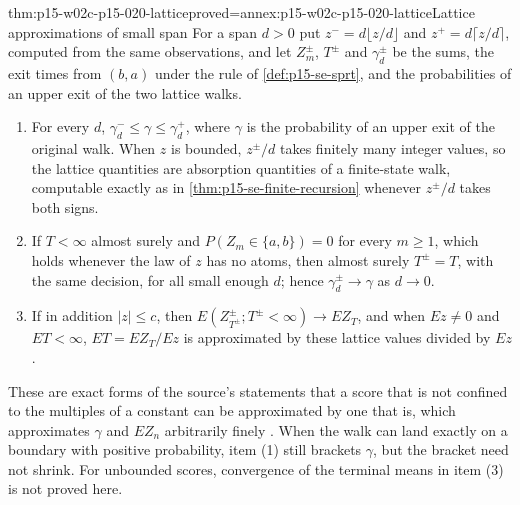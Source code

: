\begin{hbtheorem}{thm:p15-w02c-p15-020-lattice}{proved=annex:p15-w02c-p15-020-lattice}{Lattice approximations of small span}
For a span \(d>0\) put \(z^-=d\lfloor z/d\rfloor\) and
\(z^+=d\lceil z/d\rceil\), computed from the same observations, and let
\(Z_m^\pm\), \(T^\pm\) and \(\gamma^\pm_d\) be the sums, the exit times
from \((b,a)\) under the rule of \cref{def:p15-se-sprt}, and the
probabilities of an upper exit of the two lattice walks.
\begin{enumerate}
\item For every \(d\), \(\gamma^-_d\leq\gamma\leq\gamma^+_d\), where
 \(\gamma\) is the probability of an upper exit of the original walk.
 When \(z\) is bounded, \(z^\pm/d\) takes finitely many integer values,
 so the lattice quantities are absorption quantities of a finite-state
 walk, computable exactly as in \cref{thm:p15-se-finite-recursion}
 whenever \(z^\pm/d\) takes both signs.
\item If \(T<\infty\) almost surely and \(P(Z_m\in\{a,b\})=0\) for every
 \(m\geq1\), which holds whenever the law of \(z\) has no atoms, then
 almost surely \(T^\pm=T\), with the same decision, for all small enough
 \(d\); hence \(\gamma^\pm_d\to\gamma\) as \(d\to0\).
\item If in addition \(|z|\leq c\), then
 \(E(Z^\pm_{T^\pm};T^\pm<\infty)\to EZ_T\), and when \(Ez\neq0\) and
 \(ET<\infty\), \(ET=EZ_T/Ez\) is approximated by these lattice values
 divided by \(Ez\).
\end{enumerate}
These are exact forms of the source's statements that a score that is
not confined to the multiples of a constant can be approximated by one
that is, which approximates \(\gamma\) and \(EZ_n\) arbitrarily finely
\cite[Section 3.4, p.~136; Section 4.1, p.~143]{Wald1945SequentialTests}.
When the walk can land exactly on a boundary with positive probability,
item (1) still brackets \(\gamma\), but the bracket need not shrink.
For unbounded scores, convergence of the terminal means in item (3) is
not proved here.
\end{hbtheorem}

